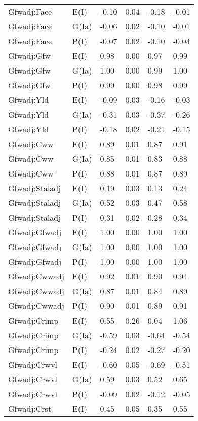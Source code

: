 \begin{center}
\begin{longtable}{|p{1.1in}|p{0.7in}|p{0.7in}|p{0.6in}|p{0.6in}|p{0.6in}|}
  Gfwadj:Face & E(I) & -0.10 & 0.04 & -0.18 & -0.01 \\ 
  Gfwadj:Face & G(Ia) & -0.06 & 0.02 & -0.10 & -0.01 \\ 
  Gfwadj:Face & P(I) & -0.07 & 0.02 & -0.10 & -0.04 \\ 
  Gfwadj:Gfw & E(I) & 0.98 & 0.00 & 0.97 & 0.99 \\ 
  Gfwadj:Gfw & G(Ia) & 1.00 & 0.00 & 0.99 & 1.00 \\ 
  Gfwadj:Gfw & P(I) & 0.99 & 0.00 & 0.98 & 0.99 \\ 
  Gfwadj:Yld & E(I) & -0.09 & 0.03 & -0.16 & -0.03 \\ 
  Gfwadj:Yld & G(Ia) & -0.31 & 0.03 & -0.37 & -0.26 \\ 
  Gfwadj:Yld & P(I) & -0.18 & 0.02 & -0.21 & -0.15 \\ 
  Gfwadj:Cww & E(I) & 0.89 & 0.01 & 0.87 & 0.91 \\ 
  Gfwadj:Cww & G(Ia) & 0.85 & 0.01 & 0.83 & 0.88 \\ 
  Gfwadj:Cww & P(I) & 0.88 & 0.01 & 0.87 & 0.89 \\ 
  Gfwadj:Staladj & E(I) & 0.19 & 0.03 & 0.13 & 0.24 \\ 
  Gfwadj:Staladj & G(Ia) & 0.52 & 0.03 & 0.47 & 0.58 \\ 
  Gfwadj:Staladj & P(I) & 0.31 & 0.02 & 0.28 & 0.34 \\ 
  Gfwadj:Gfwadj & E(I) & 1.00 & 0.00 & 1.00 & 1.00 \\ 
  Gfwadj:Gfwadj & G(Ia) & 1.00 & 0.00 & 1.00 & 1.00 \\ 
  Gfwadj:Gfwadj & P(I) & 1.00 & 0.00 & 1.00 & 1.00 \\ 
  Gfwadj:Cwwadj & E(I) & 0.92 & 0.01 & 0.90 & 0.94 \\ 
  Gfwadj:Cwwadj & G(Ia) & 0.87 & 0.01 & 0.84 & 0.89 \\ 
  Gfwadj:Cwwadj & P(I) & 0.90 & 0.01 & 0.89 & 0.91 \\ 
  Gfwadj:Crimp & E(I) & 0.55 & 0.26 & 0.04 & 1.06 \\ 
  Gfwadj:Crimp & G(Ia) & -0.59 & 0.03 & -0.64 & -0.54 \\ 
  Gfwadj:Crimp & P(I) & -0.24 & 0.02 & -0.27 & -0.20 \\ 
  Gfwadj:Crwvl & E(I) & -0.60 & 0.05 & -0.69 & -0.51 \\ 
  Gfwadj:Crwvl & G(Ia) & 0.59 & 0.03 & 0.52 & 0.65 \\ 
  Gfwadj:Crwvl & P(I) & -0.09 & 0.02 & -0.12 & -0.05 \\ 
  Gfwadj:Crst & E(I) & 0.45 & 0.05 & 0.35 & 0.55 \\ 

\end{longtable}
\end{center}

